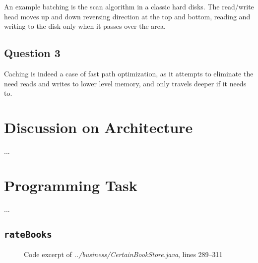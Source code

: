 \documentclass[10pt,a4paper]{article}
\newcommand{\srcroot}{../src/com/acertainbookstore/}
\newcommand{\codeexcerpt}[3]
{
\begin{figure}[H]

\caption{Code excerpt of {\it ../#1}, lines #2--#3}
\end{figure}
}
\begin{document}
An example batching is the scan algorithm in a classic hard disks. The read/write head moves up and down reversing direction at the top and bottom, reading and writing to the disk only when it passes over the area.

\subsection{Question 3}

Caching is indeed a case of fast path optimization, as it attempts to eliminate the need reads and writes to lower level memory, and only travels deeper if it needs to.


\section{Discussion on Architecture}
...



\section{Programming Task}
...

\subsection{\tt rateBooks}
\codeexcerpt{business/CertainBookStore.java}{289}{311}
\end{document}
